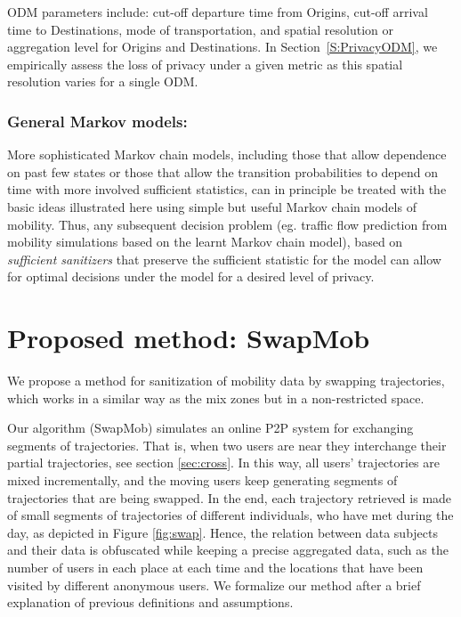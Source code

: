 \documentclass[review]{elsarticle}
\begin{document}
ODM parameters include: cut-off departure time from Origins, cut-off arrival time to Destinations, mode of transportation, and spatial resolution or aggregation level for Origins and Destinations. 
In Section~\ref{S:PrivacyODM}, we empirically assess the loss of privacy under a given metric as this spatial resolution varies for a single ODM.  %


\subsubsection{General Markov models:}
More sophisticated Markov chain models, including those that allow dependence on past few states or those that allow the transition probabilities to depend on time with more involved sufficient statistics, can in principle be treated with the basic ideas illustrated here using simple but useful Markov chain models of mobility. 
Thus, any subsequent decision problem (eg. traffic flow prediction from mobility simulations based on the learnt Markov chain model), based on {\em sufficient sanitizers} that preserve the sufficient statistic for the model can allow for optimal decisions under the model for a desired level of privacy. 


\section{Proposed method: SwapMob}\label{Sec:swapmob}

We propose a method for sanitization of mobility data by swapping trajectories, which works in a similar way as the mix zones but in a non-restricted space.


Our algorithm (SwapMob) simulates an online P2P system for exchanging segments of trajectories. That is, when two users are near they interchange their partial trajectories, see section \ref{sec:cross}.
In this way, all users' trajectories are mixed incrementally, and the moving users keep generating segments of trajectories that are being swapped. In the end, each trajectory retrieved is made of small segments of trajectories of different individuals, who have met during the day, as depicted in Figure \ref{fig:swap}. Hence, the relation between data subjects and their data is obfuscated while keeping a precise aggregated data, such as the number of users in each place at each time and the locations that have been visited by different anonymous users.  
We formalize our method after a brief explanation of previous definitions and assumptions.
\end{document}
